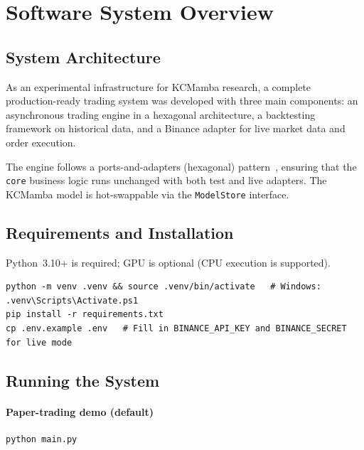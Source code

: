 \chapter{Software System Overview}
\label{ch:user_docs}

\section{System Architecture}

As an experimental infrastructure for KCMamba research, a complete
production-ready trading system was developed with three main components:
an asynchronous trading engine in a hexagonal architecture,
a backtesting framework on historical data,
and a Binance adapter for live market data and order execution.

The engine follows a ports-and-adapters (hexagonal) pattern~\cite{cockburn2005hexagonal},
ensuring that the \texttt{core} business logic runs unchanged with both test
and live adapters. The KCMamba model is hot-swappable via the \texttt{ModelStore}
interface.

\section{Requirements and Installation}

Python~3.10+ is required; GPU is optional (CPU execution is supported).

\begin{verbatim}
python -m venv .venv && source .venv/bin/activate   # Windows: .venv\Scripts\Activate.ps1
pip install -r requirements.txt
cp .env.example .env   # Fill in BINANCE_API_KEY and BINANCE_SECRET for live mode
\end{verbatim}

\section{Running the System}

\subsubsection*{Paper-trading demo (default)}

\begin{verbatim}
python main.py
\end{verbatim}

